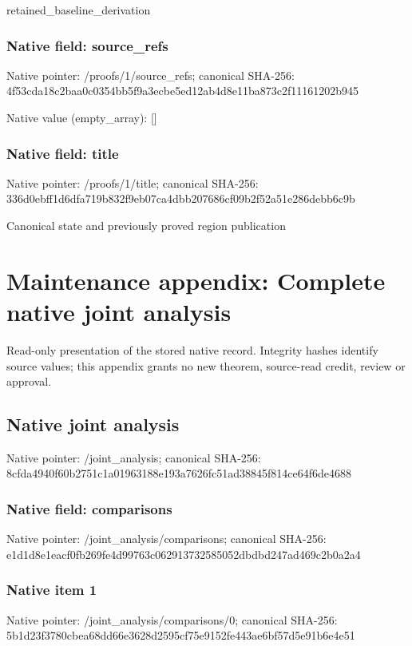 \documentclass[10pt,a4paper]{article}
\begin{document}
\begingroup\raggedright\sloppy retained\_\allowbreak{}baseline\_\allowbreak{}derivation\par\endgroup

\subsubsection{Native field: source\_\allowbreak{}refs}
Native pointer: /proofs/1/source\_\allowbreak{}refs; canonical SHA-256: 4f53cda18c2baa0c0354bb5f9a3ecbe5ed12ab4d8e11ba873c2f11161202b945

Native value (empty\_\allowbreak{}array): []

\subsubsection{Native field: title}
Native pointer: /proofs/1/title; canonical SHA-256: 336d0ebff1d6dfa719b832f9eb07ca4dbb207686cf09b2f52a51e286debb6c9b

\begingroup\raggedright\sloppy Canonical state and previously proved region publication\par\endgroup

\section{Maintenance appendix: Complete native joint analysis}
Read-only presentation of the stored native record. Integrity hashes identify source values; this appendix grants no new theorem, source-read credit, review or approval.

\subsection{Native joint analysis}
Native pointer: /joint\_\allowbreak{}analysis; canonical SHA-256: 8cfda4940f60b2751c1a01963188e193a7626fc51ad38845f814ce64f6de4688

\subsubsection{Native field: comparisons}
Native pointer: /joint\_\allowbreak{}analysis/comparisons; canonical SHA-256: e1d1d8e1eacf0fb269fe4d99763c062913732585052dbdbd247ad469c2b0a2a4

\subsubsection{Native item 1}
Native pointer: /joint\_\allowbreak{}analysis/comparisons/0; canonical SHA-256: 5b1d23f3780cbea68dd66e3628d2595cf75e9152fe443ae6bf57d5e91b6e4e51
\end{document}

